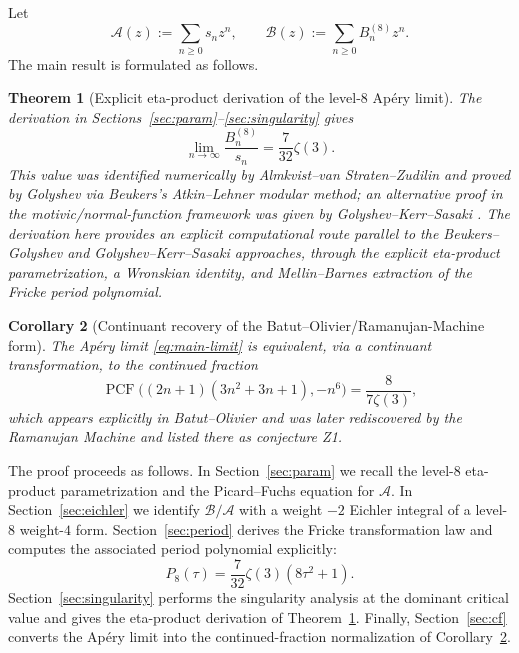 \documentclass[11pt]{amsart}
\numberwithin{equation}{section}
\theoremstyle{plain}
\newtheorem{theorem}{Theorem}[section]
\newtheorem{corollary}[theorem]{Corollary}
\theoremstyle{definition}
\theoremstyle{remark}
\DeclareMathOperator{\PCF}{PCF}
\begin{document}
Let
\[
\mathcal A(z):=\sum_{n\ge 0}s_n z^n,
\qquad
\mathcal B(z):=\sum_{n\ge 0}B_n^{(8)} z^n.
\]
The main result is formulated as follows.

\begin{theorem}[Explicit eta-product derivation of the level-$8$ Apéry limit]\label{thm:main-limit}
The derivation in Sections~\ref{sec:param}--\ref{sec:singularity} gives
\begin{equation}\label{eq:main-limit}
\lim_{n\to\infty}\frac{B_n^{(8)}}{s_n}=\frac{7}{32}\zeta(3).
\end{equation}
This value was identified numerically by Almkvist--van Straten--Zudilin
\cite{ASZ08} and proved by Golyshev \cite[Theorem~2.4,
Corollary~3.4]{Gol09} via Beukers's Atkin--Lehner modular method; an
alternative proof in the motivic/normal-function framework was given by
Golyshev--Kerr--Sasaki \cite[Section~5.5]{GKS24}. The derivation here provides an explicit computational route
parallel to the Beukers--Golyshev and Golyshev--Kerr--Sasaki approaches,
through the explicit eta-product parametrization, a Wronskian identity, and
Mellin--Barnes extraction of the Fricke period polynomial.
\end{theorem}

\begin{corollary}[Continuant recovery of the Batut--Olivier/Ramanujan-Machine form]\label{cor:main-cf}
The Apéry limit \eqref{eq:main-limit} is equivalent, via a continuant
transformation, to the continued fraction
\[
\PCF\bigl((2n+1)(3n^2+3n+1),-n^6\bigr)=\frac{8}{7\zeta(3)},
\]
which appears explicitly in Batut--Olivier \cite[Section~3.2.4]{BO80} and
was later rediscovered by the Ramanujan Machine \cite{RMK21} and listed
there as conjecture Z1.
\end{corollary}

The proof proceeds as follows. In Section~\ref{sec:param} we recall the
level-$8$ eta-product parametrization and the Picard--Fuchs equation for
$\mathcal A$. In Section~\ref{sec:eichler} we identify
$\mathcal B/\mathcal A$ with a weight $-2$ Eichler integral of a level-$8$
weight-$4$ form. Section~\ref{sec:period} derives the Fricke transformation
law and computes the associated period polynomial explicitly:
\[
P_8(\tau)=\frac{7}{32}\zeta(3)(8\tau^2+1).
\]
Section~\ref{sec:singularity} performs the singularity analysis at the
dominant critical value and gives the eta-product derivation of
Theorem~\ref{thm:main-limit}. Finally, Section~\ref{sec:cf} converts the
Apéry limit into the continued-fraction normalization of
Corollary~\ref{cor:main-cf}.
\end{document}
